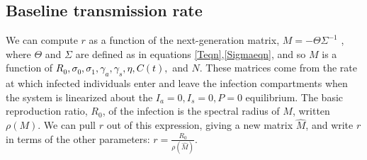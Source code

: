 \subsection{Baseline transmission rate} 
\label{nextgen}
We can compute $r$ as a function of the next-generation matrix, $M = - \Theta \Sigma ^{-1}$  \cite{diekmann2010construction}, where $\Theta$ and $\Sigma$ are defined as in equations \ref{Teqn},\ref{Sigmaeqn}, and so $M$ is a function of \textcolor{black}{ $R_0, \sigma_0,\sigma_1, \gamma_a, \gamma_s, \eta, C(t),$} and $N$. These matrices come from the rate at which infected individuals enter and leave the  infection compartments when the system is linearized about the $I_a = 0, I_s = 0, P = 0$ equilibrium. The basic reproduction ratio, $R_0$, of the infection is the spectral radius of $M$, written $\rho(M)$. We can pull $r$ out of this expression, giving a new matrix $\hat{M}$, and write $r$ in terms of the other parameters: $r = \frac{R_0}{\rho(\hat{M})}$.
\tiny
\setcounter{MaxMatrixCols}{20}
